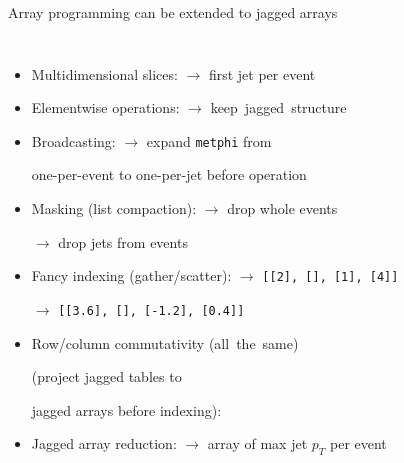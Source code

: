 \documentclass[aspectratio=169]{beamer}
\begin{document}
\begin{frame}{Array programming can be extended to jagged arrays}
\vspace{0.1 cm}
\begin{columns}
\begin{itemize}\setlength{\itemsep}{0.15 cm}
\item Multidimensional slices:  $\to$ first jet per event
\item Elementwise operations:  $\to$ \mbox{keep jagged structure\hspace{-1 cm}}
\item Broadcasting:  $\to$ expand {\small \texttt{metphi}} from

\tabto{5.5 cm}one-per-event to one-per-jet before operation

\item Masking (list compaction):  $\to$ drop whole events

 $\to$ drop jets from events

\item Fancy indexing (gather/scatter):  $\to$ \mbox{\small \texttt{[[2], [], [1], [4]]}\hspace{-0.5 cm}}

 $\to$ \mbox{\small \texttt{[[3.6], [], [-1.2], [0.4]]}\hspace{-0.5 cm}}

\item Row/column commutativity  \mbox{(all the same)\hspace{-0.5 cm}}

(project jagged tables to 

jagged arrays before indexing): 



\item Jagged array reduction:  $\to$ array of max jet $p_T$ per event
\end{itemize}
\end{columns}
\end{frame}
\end{document}
